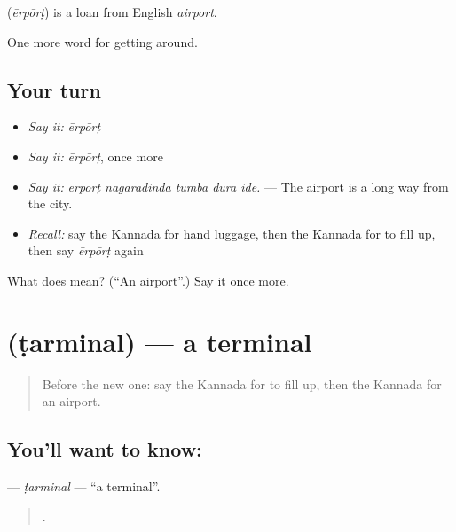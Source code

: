 \begin{cousinweb}
\textbf{} (\emph{ērpōrṭ}) is a loan from English \emph{airport}.
\end{cousinweb}

\begin{grammarlens}[title={What you've built}]
One more word for getting around.
\end{grammarlens}

\subsection*{Your turn}
\begin{itemize}
\raggedright
  \item \emph{Say it:} \emph{ērpōrṭ}
  \item \emph{Say it:} \emph{ērpōrṭ}, once more
  \item \emph{Say it:} \emph{ērpōrṭ nagaradinda tumbā dūra ide.} — The airport is a long way from the city.
  \item \emph{Recall:} say the Kannada for hand luggage, then the Kannada for to fill up, then say \emph{ērpōrṭ} again
\end{itemize}

\begin{tcolorbox}[breakable,colback=teal!4,colframe=teal!35!black,title={Before you move on}]
What does  mean? (\textquotedblleft{}An airport\textquotedblright{}.) Say it once more.
\end{tcolorbox}
\section[\texorpdfstring{\kn{ಟರ್ಮಿನಲ್} (ṭarminal)}{ಟರ್ಮಿನಲ್ (ṭarminal)}]{ (ṭarminal) — a terminal}

\label{lesson:KA-C437-tarminal}



\begin{quote}
Before the new one: say the Kannada for to fill up, then the Kannada for an airport.
\end{quote}

\subsection*{You'll want to know: }
\textbf{} — \emph{ṭarminal} — \textquotedblleft{}a terminal\textquotedblright{}.

\begin{quote}
    .
\end{quote}

